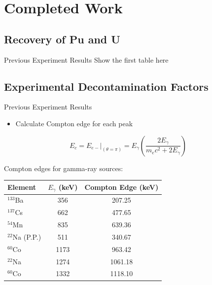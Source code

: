 \documentclass{beamer}
\begin{document}
\section{Completed Work}
\begin{frame}
\sectionpage
\end{frame}

\subsection{Recovery of Pu and U}
\begin{frame}{Previous Experiment Results}
Show the first table here
\end{frame}

\subsection{Experimental Decontamination Factors}
\begin{frame}{Previous Experiment Results}
  \begin{itemize}
  \item Calculate Compton edge for each peak
  \end{itemize}
  \begin{equation} \label{compton_edge}
  E_c = E_{e-}\vert_{(\theta=\pi)} = E_\gamma \left(\frac{2E_\gamma}{m_ec^2+2E_\gamma}\right)
  \end{equation}
  \begin{block}{Compton edges for gamma-ray sources:}
    \begin{center}
  \vskip -0.2cm
  \begin{tabular}{l  c  c}\toprule
   Element  & $E_\gamma$ (keV) & Compton Edge (keV) \\ \midrule \vspace{0.1cm}
   $^{133}$Ba & 356 & 207.25 \\
   $^{137}$Cs & 662 & 477.65 \\
   $^{54}$Mn & 835 & 639.36 \\
   $^{22}$Na (P.P.) & 511 & 340.67 \\
   $^{60}$Co & 1173 & 963.42 \\
   $^{22}$Na & 1274 & 1061.18 \\
   $^{60}$Co & 1332 & 1118.10 \\ \bottomrule
  \end{tabular}
  \end{center}
  \end{block}
\end{frame}
\end{document}
